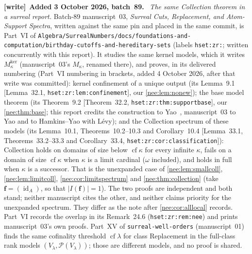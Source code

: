 \documentclass[11pt,letterpaper]{article}
\numberwithin{equation}{section}
\theoremstyle{plain}
\theoremstyle{definition}
\theoremstyle{remark}
\newcommand{\cf}{\operatorname{cf}}
\newenvironment{writenote}[1][]{\par\smallskip\begingroup\small\raggedright
 \setlength{\parindent}{1.25em}\noindent\textbf{[write]}\if\relax\detokenize{#1}\relax\else~\textbf{#1.}\fi\ }%
 {\par\endgroup\smallskip}
\begin{document}
\begin{writenote}[Added 3 October 2026, batch~89]
\emph{The same Collection theorem in a surreal report.} Batch-89 manuscript~03, \emph{Surreal Cuts, Replacement, and Atom-Support Spectra}, written against the same pin and placed in the same commit, is Part~VI of \nolinkurl{Algebra/SurrealNumbers/docs/foundations-and-computation/birthday-cutoffs-and-hereditary-sets} (labels \texttt{hset:zr:}; written concurrently with this report). It studies the same kernel models, which it writes $M^{\mathrm{ker}}_\kappa$ (manuscript~03's $M_\kappa$, renamed there), and proves, in its delivered numbering (Part~VI numbering in brackets, added 4 October 2026, after that write was committed): kernel confinement of a unique output (its Lemma~9.1 [Lemma~32.1, \texttt{hset:zr:lem:confinement}], our \cref{nee:lem:nonew}); the base model theorem (its Theorem~9.2 [Theorem~32.2, \texttt{hset:zr:thm:supportbase}], our \cref{nee:thm:base}; this report credits the construction to Yao~\cite{Yao2023}, manuscript~03 to Yao and to Hamkins--Yao with L\'evy); and the Collection spectrum of these models (its Lemma~10.1, Theorems~10.2--10.3 and Corollary~10.4 [Lemma~33.1, Theorems~33.2--33.3 and Corollary~33.4, \texttt{hset:zr:cor:classification}]): Collection holds on domains of size below $\cf\kappa$ for every infinite $\kappa$, fails on a domain of size $\cf\kappa$ when $\kappa$ is a limit cardinal ($\omega$ included), and holds in full when $\kappa$ is a successor. That is the unexpanded case of \cref{nee:lem:smallcoll}, \cref{nee:lem:limitcoll}, \cref{nee:cor:limitspectrum} and \cref{nee:thm:collection} (take $\boldsymbol f=(\operatorname{id}_A)$, so that $|I(\boldsymbol f)|=1$). The two proofs are independent and both stand; neither manuscript cites the other, and neither claims priority for the unexpanded spectrum. They differ as the note after \cref{nee:cor:alllocal} records. Part~VI records the overlap in its Remark~24.6 (\texttt{hset:zr:rem:nee}) and prints manuscript~03's own proofs. Part~XV of \nolinkurl{surreal-well-orders} (manuscript~01) finds the same cofinality threshold $\cf\lambda$ for class Replacement in the full-class rank models $(V_\lambda,\mathcal P(V_\lambda))$; those are different models, and no proof is shared.


\end{writenote}
\end{document}

